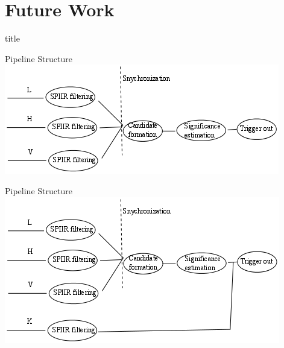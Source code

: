 \documentclass{beamer}
\begin{document}
\section{Future Work}

\begin{frame}
  \vfill
  \centering
  \begin{beamercolorbox}[sep=8pt,center,shadow=true,rounded=true]{title}
    \insertsectionhead\par%
  \end{beamercolorbox}
  \vfill
\end{frame}

\begin{frame}{Pipeline Structure}
    \centering
    \includegraphics[width=\textwidth]{../resources/current_pipeline.png}
\end{frame}

\begin{frame}{Pipeline Structure}
    \centering
    \includegraphics[width=\textwidth]{../resources/new_pipeline.png}
\end{frame}
\end{document}
